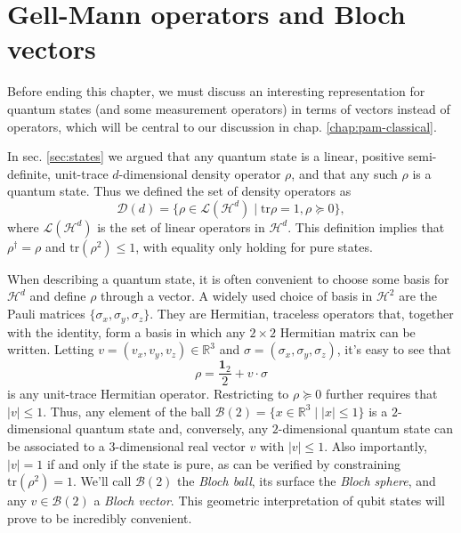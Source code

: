 	\section{Gell-Mann operators and Bloch vectors}
	\label{sec:gell-mann}

		Before ending this chapter, we must discuss an interesting representation for quantum states (and some measurement operators) in terms of vectors instead of operators, which will be central to our discussion in chap. \ref{chap:pam-classical}.

		In sec. \ref{sec:states} we argued that any quantum state is a linear, positive semi-definite, unit-trace $d$-dimensional density operator $\rho$, and that any such $\rho$ is a quantum state. Thus we defined the set of density operators as
		$$
			\mathcal{D}(d) = \{ \rho \in \mathcal{L}(\mathcal{H}^d) \mid \text{tr}\rho=1, \rho \succeq0 \} ,
		$$
		where $\mathcal{L}(\mathcal{H}^d)$ is the set of linear operators in $\mathcal{H}^d$. This definition implies that $\rho^\dagger = \rho$ and $\text{tr}(\rho^2) \leq 1$, with equality only holding for pure states.

		When describing a quantum state, it is often convenient to choose some basis for $\mathcal{H}^d$ and define $\rho$ through a vector. A widely used choice of basis in $\mathcal{H}^2$ are the Pauli matrices $\{\sigma_x, \sigma_y, \sigma_z\}$. They are Hermitian, traceless operators that, together with the identity, form a basis in which any $2 \times 2$ Hermitian matrix can be written. Letting $v = (v_x, v_y, v_z) \in \mathbb{R}^3$ and $\sigma = (\sigma_x, \sigma_y, \sigma_z)$, it's easy to see that
		$$
			\rho = \frac{\mathbf{1}_2}{2} + v \cdot \sigma
		$$
		is any unit-trace Hermitian operator. Restricting to $\rho \succeq 0$ further requires that $\lvert v \rvert \leq 1$. Thus, any element of the ball $\mathcal{B}(2) = \{ x \in \mathbb{R}^3 \mid \lvert x \vert \leq 1 \}$ is a $2$-dimensional quantum state and, conversely, any $2$-dimensional quantum state can be associated to a $3$-dimensional real vector $v$ with $\lvert v \rvert \leq 1$. Also importantly, $\lvert v \rvert = 1$ if and only if the state is pure, as can be verified by constraining $\text{tr}(\rho^2) = 1$. We'll call $\mathcal{B}(2)$ the \emph{Bloch ball}, its surface the \emph{Bloch sphere}, and any $v \in \mathcal{B}(2)$ a \emph{Bloch vector}. This geometric interpretation of qubit states will prove to be incredibly convenient.

